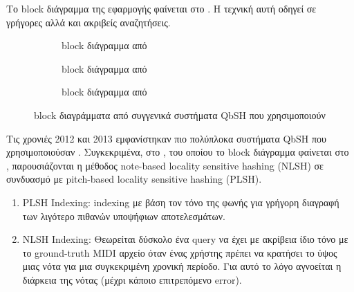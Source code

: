Το block διάγραμμα της εφαρμογής φαίνεται στο .
Η τεχνική αυτή οδηγεί σε γρήγορες αλλά και ακριβείς αναζητήσεις.

\begin{figure}[htb]
    \centering
    \begin{subfigure}[t]{0.3\linewidth}
        \caption{block διάγραμμα από \protect\cite{wang2012query}}
        \label{fig:wang2012query}
    \end{subfigure}\hfill
    \begin{subfigure}[t]{0.3\linewidth}
        \caption{block διάγραμμα από \protect\cite{guo2012query}}
        \label{fig:guo2012query}
    \end{subfigure}\hfill
    \begin{subfigure}[t]{0.3\linewidth}
        \caption{block διάγραμμα από \protect\cite{guo2013query}}
        \label{fig:guo2013query}
    \end{subfigure}
    \caption{block διαγράμματα από συγγενικά συστήματα QbSH που χρησιμοποιούν \lsh{}}
    \label{fig:many-lsb-blocks}
\end{figure}

Τις χρονιές 2012 και 2013 εμφανίστηκαν πιο πολύπλοκα συστήματα QbSH που χρησιμοποιούσαν \lsh{}.
Συγκεκριμένα, στο \cite{wang2012query}, του οποίου το block διάγραμμα φαίνεται στο ,
παρουσιάζονται η μέθοδος note-based locality sensitive hashing (NLSH)
σε συνδυασμό με pitch-based locality sensitive hashing (PLSH).
\begin{enumerate}
    \item PLSH Indexing:
    indexing με βάση τον τόνο της φωνής για γρήγορη διαγραφή των λιγότερο πιθανών υποψήφιων αποτελεσμάτων.
    \item NLSH Indexing:
    Θεωρείται δύσκολο ένα query να έχει με ακρίβεια ίδιο τόνο με το ground-truth MIDI αρχείο όταν ένας χρήστης πρέπει να κρατήσει το ύψος μιας νότα για μια συγκεκριμένη χρονική περίοδο.
    Για αυτό το λόγο αγνοείται η διάρκεια της νότας (μέχρι κάποιο επιτρεπόμενο error).
\end{enumerate}

